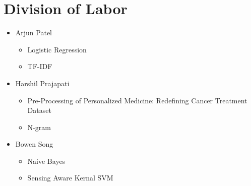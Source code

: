 \documentclass[10pt,twocolumn,letterpaper]{article}
\begin{document}
\newpage
\section*{Division of Labor}
\begin{itemize}
	\item  Arjun Patel
	\begin{itemize}
		\item Logistic Regression
		\item TF-IDF
	\end{itemize}
	\item  Harshil Prajapati
	\begin{itemize}
		\item Pre-Processing of Personalized Medicine: Redefining Cancer Treatment Dataset
		\item N-gram
	\end{itemize}
	\item Bowen Song
	\begin{itemize}
		\item Naive Bayes 
		\item Sensing Aware Kernal SVM
	\end{itemize}
\end{itemize}

{\small


}
\end{document}
